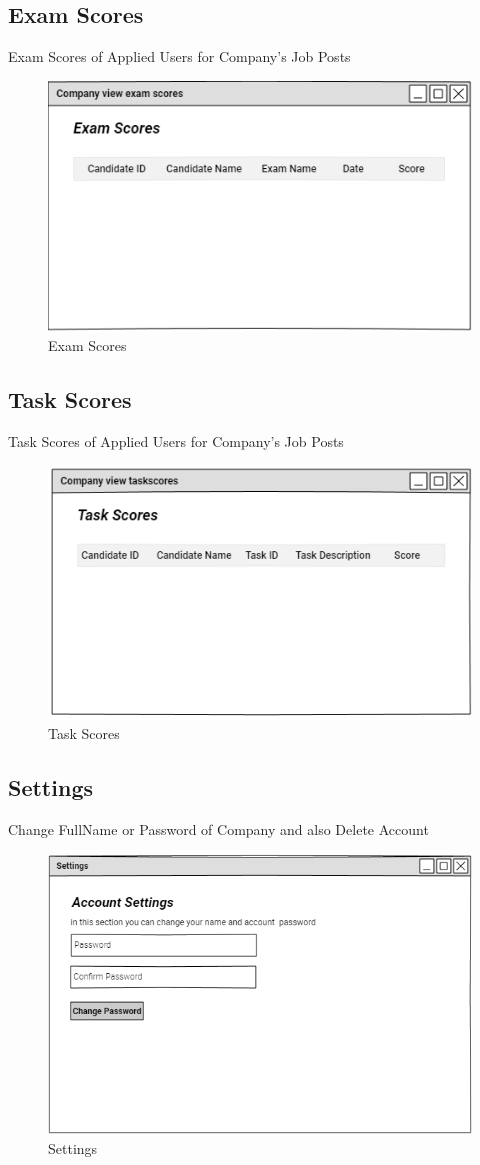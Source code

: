 \documentclass[a4paper,12pt]{report}
\begin{document}
\subsection {Exam Scores}
Exam Scores of Applied Users for Company's Job Posts
\begin{figure}[bph]
	\centering
	\includegraphics[width=.6\linewidth]{img/company/cmpnyviewexmscr}
	\caption{Exam Scores}
\end{figure}
\pagebreak
\subsection {Task Scores}
Task Scores of Applied Users for Company's Job Posts
\begin{figure}[bph]
	\centering
	\includegraphics[width=.7\linewidth]{img/company/cmpnytaskviewscr}
	\caption{Task Scores}
\end{figure}

\subsection {Settings}
Change FullName or Password of Company and also Delete Account
\begin{figure}[bph]
	\centering
	\includegraphics[width=.6\linewidth]{img/company/cmpnystngs}
	\caption{Settings}
\end{figure}
\pagebreak
{}
\end{document}
